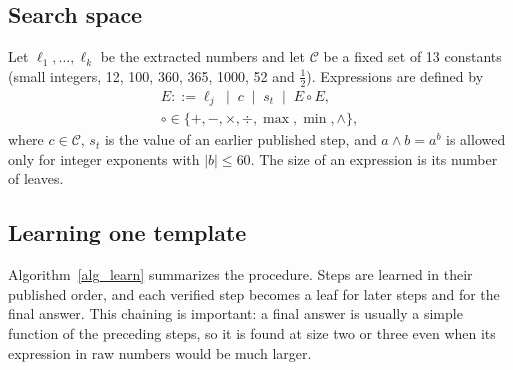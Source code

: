 \documentclass[conference]{IEEEtran}
\begin{document}
\subsection{Search space}
Let $\ell_1,\dots,\ell_k$ be the extracted numbers and let $\mathcal{C}$ be a
fixed set of 13 constants (small integers, 12, 100, 360, 365, 1000, 52 and
$\tfrac12$). Expressions are defined by
\begin{equation}
\begin{gathered}
E ::= \ell_j \;\mid\; c \;\mid\; s_t \;\mid\; E \circ E,\\
\circ\in\{+,-,\times,\div,\max,\min,\wedge\},
\end{gathered}
\label{eq_grammar}
\end{equation}
where $c\in\mathcal{C}$, $s_t$ is the value of an earlier published step, and
$a\wedge b=a^{b}$ is allowed only for integer exponents with $|b|\le 60$. The
size of an expression is its number of leaves.

\subsection{Learning one template}
Algorithm~\ref{alg_learn} summarizes the procedure. Steps are learned in their
published order, and each verified step becomes a leaf for later steps and for
the final answer. This chaining is important: a final answer is usually a
simple function of the preceding steps, so it is found at size two or three even
when its expression in raw numbers would be much larger.
\end{document}

